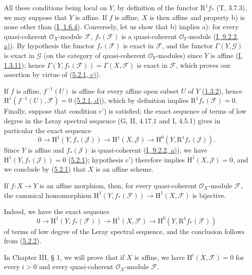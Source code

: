 All these conditions being local on $Y$, by definition of the functor
$\mathrm{R}^1f_*$ (T, 3.7.3), we may suppose that $Y$ is affine. If $f$
is affine, $X$ is then affine and property b) is none other than
(\hyperref[I.1.6.4]{I, 1.6.4}). Conversely, let us show that b) implies
a): for every quasi-coherent $\mathcal{O}_X$-module $\mathcal{F}$,
$f_*(\mathcal{F})$ is a quasi-coherent $\mathcal{O}_Y$-module
(\hyperref[I.9.2.2]{I, 9.2.2, a)}). By hypothesis the functor
$f_*(\mathcal{F})$ is exact in $\mathcal{F}$, and the functor
$\Gamma(Y,\mathcal{G})$ is exact in $\mathcal{G}$ (on the category of
quasi-coherent $\mathcal{O}_Y$-modules) since $Y$ is affine
(\hyperref[I.1.3.11]{I, 1.3.11}); hence
$\Gamma(Y,f_*(\mathcal{F}))=\Gamma(X,\mathcal{F})$ is exact in
$\mathcal{F}$, which proves our assertion by virtue of
(\hyperref[II.5.2.1]{5.2.1, c)}).

If $f$ is affine, $f^{-1}(U)$ is affine for every affine open subset $U$ of
$Y$ (\hyperref[II.1.3.2]{1.3.2}), hence
$\mathrm{H}^1(f^{-1}(U),\mathcal{F})=0$
(\hyperref[II.5.2.1]{5.2.1, d)}), which by definition implies
$\mathrm{R}^1f_*(\mathcal{F})=0$. Finally, suppose that condition
c') is satisfied; the exact sequence of terms of low degree in the
Leray spectral sequence (G, II, 4.17.1 and I, 4.5.1) gives in particular
the exact sequence
\[
  0\to\mathrm{H}^1(Y,f_*(\mathcal{J}))\to
  \mathrm{H}^1(X,\mathcal{J})\to
  \mathrm{H}^0(Y,\mathrm{R}^1f_*(\mathcal{J})).
\]
Since $Y$ is affine and $f_*(\mathcal{J})$ is quasi-coherent
(\hyperref[I.9.2.2]{I, 9.2.2, a)}), we have
$\mathrm{H}^1(Y,f_*(\mathcal{J}))=0$
(\hyperref[II.5.2.1]{5.2.1}); hypothesis c') therefore implies
$\mathrm{H}^1(X,\mathcal{J})=0$, and we conclude by
(\hyperref[II.5.2.1]{5.2.1}) that $X$ is an affine scheme.

\begin{corollary}[5.2.3]
\label{II.5.2.3}
If $f:X\to Y$ is an affine morphism, then, for every quasi-coherent
$\mathcal{O}_X$-module $\mathcal{F}$, the canonical homomorphism
$\mathrm{H}^1(Y,f_*(\mathcal{F}))\to\mathrm{H}^1(X,\mathcal{F})$ is
bijective.
\end{corollary}


Indeed, we have the exact sequence
\[
  0\to\mathrm{H}^1(Y,f_*(\mathcal{F}))\to
  \mathrm{H}^1(X,\mathcal{F})\to
  \mathrm{H}^0(Y,\mathrm{R}^1f_*(\mathcal{F}))
\]
of terms of low degree of the Leray spectral sequence, and the conclusion
follows from (\hyperref[II.5.2.2]{5.2.2}).

\begin{remark}[5.2.4]
\label{II.5.2.4}
In Chapter III, § 1, we will prove that if $X$ is affine, we have
$\mathrm{H}^i(X,\mathcal{F})=0$ for every $i>0$ and every quasi-coherent
$\mathcal{O}_X$-module $\mathcal{F}$.
\end{remark}


